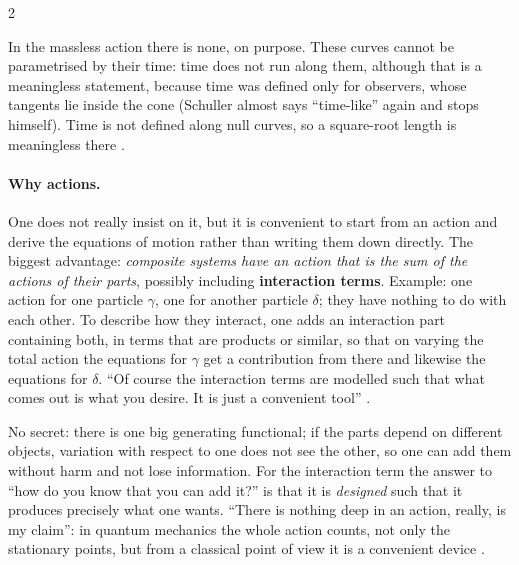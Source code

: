 \begin{paracol}{2}
\begin{coursenote}
In the massless action there is none, on purpose. These curves cannot be parametrised by their time: time does not run along them, although that is a meaningless statement, because time was defined only for observers, whose tangents lie inside the cone (Schuller almost says ``time-like'' again and stops himself). Time is not defined along null curves, so a square-root length is meaningless there .
\end{coursenote}

\paragraph{Why actions.} One does not really insist on it, but it is convenient to start from an action and derive the equations of motion rather than writing them down directly. The biggest advantage: \emph{composite systems have an action that is the sum of the actions of their parts}, possibly including \textbf{interaction terms}. Example: one action for one particle $\gamma$, one for another particle $\delta$; they have nothing to do with each other. To describe how they interact, one adds an interaction part containing both, in terms that are products or similar, so that on varying the total action the equations for $\gamma$ get a contribution from there and likewise the equations for $\delta$. ``Of course the interaction terms are modelled such that what comes out is what you desire. It is just a convenient tool'' .
\begin{coursenote}
No secret: there is one big generating functional; if the parts depend on different objects, variation with respect to one does not see the other, so one can add them without harm and not lose information. For the interaction term the answer to ``how do you know that you can add it?'' is that it is \emph{designed} such that it produces precisely what one wants. ``There is nothing deep in an action, really, is my claim'': in quantum mechanics the whole action counts, not only the stationary points, but from a classical point of view it is a convenient device .
\end{coursenote}


\end{paracol}
